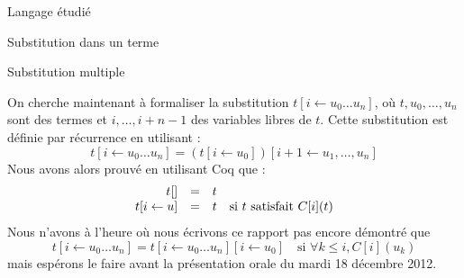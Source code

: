 \documentclass[a4paper,twoside,12pt]{article}
\begin{document}
\begin{partie}{Langage étudié}
\begin{sous-partie}{Substitution dans un terme}
\begin{sous-sous-partie}{Substitution multiple}
\begin{paragraph}{}
On cherche maintenant à formaliser la substitution $t[i\leftarrow u_0\dots u_n]$, où $t, u_0, \dots, u_n$ sont des termes et $i, \dots, i+n-1$ des variables libres de $t$. Cette substitution est définie par récurrence en utilisant :
$$t[i\leftarrow u_0\dots u_n] = (t[i\leftarrow u_0])[i+1\leftarrow u_1,\dots,u_n]$$
Nous avons alors prouvé en utilisant Coq que :
$$\begin{array}{rcl}
t[] &=& t\\
t[i\leftarrow u] &=& t\quad\mbox{si $t$ satisfait $C[i](t)$}
\end{array}$$
Nous n'avons à l'heure où nous écrivons ce rapport pas encore démontré que
$$t[i\leftarrow u_0\dots u_n] = t[i\leftarrow u_0\dots u_n][i\leftarrow u_0] \quad\mbox{si $\forall k\le i, C[i](u_k)$}$$
mais espérons le faire avant la présentation orale du mardi 18 décembre 2012.
\end{paragraph}
\end{sous-sous-partie}
\end{sous-partie}

\end{partie}

\glsaddall
\printglossary[title={Glossaire\markright{GLOSSAIRE}}]
\end{document}
